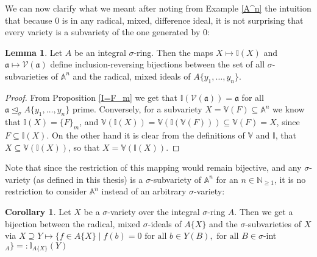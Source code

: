 \documentclass{article}
\def\I{\mathbb{I}}
\def\NE{\mathbb{N}_{\geq1}}
\def\V{\mathcal{V}}
\def\VV{\mathbb{V}}
\def\a{\mathfrak{a}}
\def\s{\sigma}
\def\si{\unlhd_{\sigma}}
\def\fa{\text{ for all }}
\newenvironment{bew}{\begin{proof}[Proof]}{\end{proof}}
\theoremstyle{definition}
\newtheorem{cor}[Satz]{Corollary}
\newtheorem{lem}[Satz]{Lemma}
\begin{document}
We can now clarify what we meant after noting from Example \ref{A^n} the intuition that because $0$ is in any radical, mixed, difference ideal, it is not surprising that every variety is a subvariety of the one generated by $0$:

 \begin{lem}
Let $A$ be an integral $\s$-ring. Then the maps $X \mapsto \I(X)$ and $\a \mapsto \V(\a)$ define inclusion-reversing bijections between the set of all $\s$-subvarieties of $\mathbb{A}^n$ and the radical, mixed ideals of $A\{y_1,\ldots,y_n\}$.
\begin{bew}
From Proposition \ref{I=F_m} we get that $\I(\V(\a)) = \a$ for all $\a \si A\{y_1,\ldots,y_n\}$ prime. Conversely, for a subvariety $X = \VV(F) \subseteq \mathbb{A}^n$ we know that $\I(X) = \{F\}_m$, and $\VV(\I(X)) = \VV(\I(\VV(F))) \subseteq \VV(F) = X$,
 since $F \subseteq \I(X)$. On the other hand it is clear from the definitions of $\VV$ and $ \I$, that $X \subseteq \VV(\I(X))$, so that $X = \VV(\I(X))$. 
\end{bew}
\end{lem}

Note that since the restriction of this mapping would remain bijective, and any $\s$-variety (as defined in this thesis) is a $\s$-subvariety of $\mathbb{A}^n$ for an $n \in \NE$, it is no restriction to consider $\mathbb{A}^n$ instead of an arbitrary $\s$-variety:
\begin{cor}
  Let $X$ be a $\s$-variety over the integral $\s$-ring $A$. Then we get a bijection between the radical, mixed $\s$-ideals of $A\{X\}$ and the $\s$-subvarieties of $X$ via $X \supseteq Y \mapsto \{f \in A\{X\} \mid f(b) = 0 \fa b \in Y(B), \fa B \in \s$-int$_A \} =: \I_{A\{X\}}(Y)$
\end{cor}
\end{document}
